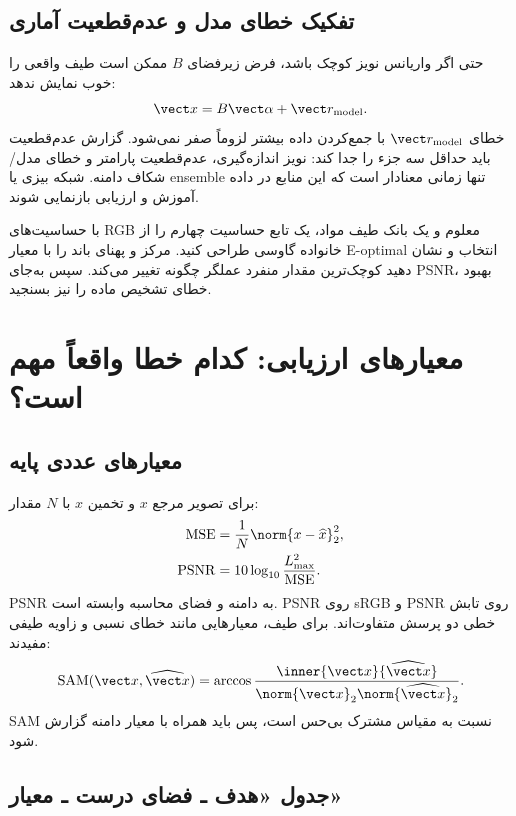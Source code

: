 \subsection{تفکیک خطای مدل و عدم‌قطعیت آماری}

حتی اگر واریانس نویز کوچک باشد، فرض زیر‌فضای \(B\) ممکن است طیف واقعی را خوب نمایش ندهد:
\begin{equation}
\vect x=B\vect\alpha+\vect r_{\mathrm{model}}.
\end{equation}
خطای \(\vect r_{\mathrm{model}}\) با جمع‌کردن داده بیشتر لزوماً صفر نمی‌شود. گزارش عدم‌قطعیت باید
حداقل سه جزء را جدا کند: نویز اندازه‌گیری، عدم‌قطعیت پارامتر و خطای مدل/شکاف دامنه. شبکه بیزی یا
ensemble تنها زمانی معنادار است که این منابع در داده آموزش و ارزیابی بازنمایی شوند.

\begin{researchbox}
با حساسیت‌های RGB معلوم و یک بانک طیف مواد، یک تابع حساسیت چهارم را از خانواده گاوسی طراحی کنید.
مرکز و پهنای باند را با معیار E-optimal انتخاب و نشان دهید کوچک‌ترین مقدار منفرد عملگر چگونه تغییر
می‌کند. سپس به‌جای PSNR، بهبود خطای تشخیص ماده را نیز بسنجید.
\end{researchbox}

\section{معیارهای ارزیابی: کدام خطا واقعاً مهم است؟}

\subsection{معیارهای عددی پایه}

برای تصویر مرجع \(x\) و تخمین \(\widehat x\) با \(N\) مقدار:
\begin{align}
\operatorname{MSE}&=\frac1N\norm{x-\widehat x}_2^2,\\
\operatorname{PSNR}&=10\log_{10}\frac{L_{\max}^2}{\operatorname{MSE}}.
\end{align}
PSNR به دامنه و فضای محاسبه وابسته است. PSNR روی sRGB و PSNR روی تابش خطی دو پرسش متفاوت‌اند.
برای طیف، معیارهایی مانند خطای نسبی و زاویه طیفی مفیدند:
\begin{equation}
\operatorname{SAM}(\vect x,\widehat{\vect x})
=\arccos\frac{\inner{\vect x}{\widehat{\vect x}}}
{\norm{\vect x}_2\norm{\widehat{\vect x}}_2}.
\end{equation}
SAM نسبت به مقیاس مشترک بی‌حس است، پس باید همراه با معیار دامنه گزارش شود.

\subsection{جدول «هدف ـ فضای درست ـ معیار»}

